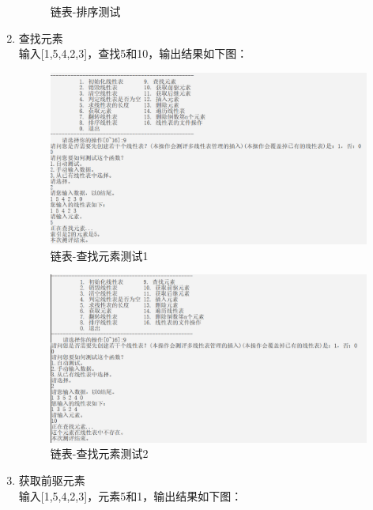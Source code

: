 \documentclass[supercite]{Experimental_Report}
\theoremstyle{definition}
\begin{document}
\begin{enumerate}
\begin{figure}[htb]
\begin{center}
				\caption{链表-排序测试}
				\label{fig1-10}
			\end{center}
		\end{figure}
		\newpage
		\item 查找元素\\
		输入[1,5,4,2,3]，查找5和10，输出结果如下图：
		\begin{figure}[htb]
			\begin{center}
				\includegraphics[scale=0.60]{images/链表-查找元素.png}
				\caption{链表-查找元素测试1}
				\label{fig1-11.1}
			\end{center}
		\end{figure}
		\begin{figure}[htb]
			\begin{center}
				\includegraphics[scale=0.60]{images/链表-查找元素异常.png}
				\caption{链表-查找元素测试2}
				\label{fig1-11.2}
			\end{center}
		\end{figure}
		\newpage
		\item 获取前驱元素\\
		输入[1,5,4,2,3]，元素5和1，输出结果如下图：
		\begin{figure}[htb]

\end{figure}
\end{enumerate}
\end{document}
